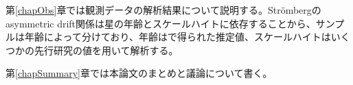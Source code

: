 第\ref{chapObs}章では観測データの解析結果について説明する。Str\"{o}mbergのasymmetric drift関係は星の年齢とスケールハイトに依存することから、サンプルは年齢によって分けており、年齢は\cite{SD18}で得られた推定値、スケールハイトはいくつかの先行研究の値を用いて解析する。

第\ref{chapSummary}章では本論文のまとめと議論について書く。







\def\arraybackslash{\let\\\tabularnewline}

